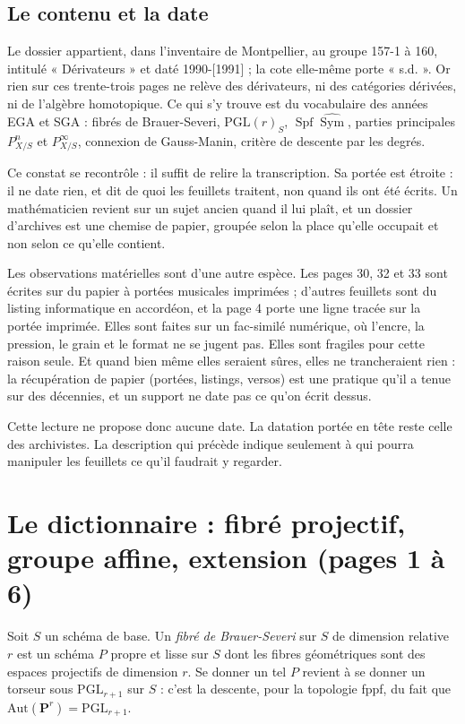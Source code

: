 \documentclass[11pt,a4paper]{article}
\begin{document}
\subsection*{Le contenu et la date}

Le dossier appartient, dans
l'inventaire de Montpellier, au groupe 157-1 à 160, intitulé « Dérivateurs »
et daté 1990-[1991] ; la cote elle-même porte « s.d. ». Or rien sur ces
trente-trois pages ne relève des dérivateurs, ni des catégories dérivées, ni
de l'algèbre homotopique. Ce qui s'y trouve est du vocabulaire des années EGA
et SGA : fibrés de Brauer-Severi, $\mathrm{PGL}(r)_S$,
$\operatorname{Spf} \widehat{\operatorname{Sym}}$, parties principales
$P^n_{X/S}$ et $P^\infty_{X/S}$, connexion de Gauss-Manin, critère de descente
par les degrés.

Ce constat se recontrôle : il suffit de relire la
transcription. Sa portée est étroite : il ne date rien, et dit de quoi les
feuillets traitent, non quand ils ont été écrits. Un mathématicien revient sur un sujet ancien quand il lui plaît, et un
dossier d'archives est une chemise de papier, groupée selon la place qu'elle
occupait et non selon ce qu'elle contient.

Les observations matérielles sont d'une autre espèce. Les pages 30, 32 et 33
sont écrites sur du papier à portées musicales imprimées ; d'autres feuillets
sont du listing informatique en accordéon, et la page 4 porte une ligne tracée
sur la portée imprimée. Elles sont faites sur un
fac-similé numérique, où l'encre, la pression, le grain et le format ne se
jugent pas. Elles sont fragiles pour cette raison seule. Et quand bien même
elles seraient sûres, elles ne trancheraient rien : la récupération de papier
(portées, listings, versos) est une pratique qu'il a tenue sur des
décennies, et un support ne date pas ce qu'on écrit dessus.

Cette lecture ne propose donc aucune date. La datation portée en
tête reste celle des archivistes. La description qui précède indique
seulement à qui pourra manipuler les feuillets ce qu'il faudrait y regarder.

\section*{Le dictionnaire : fibré projectif, groupe affine, extension (pages 1 à 6)}

Soit $S$ un schéma de base. Un \emph{fibré de Brauer-Severi} sur $S$ de
dimension relative $r$ est un schéma $P$ propre et lisse sur $S$ dont les
fibres géométriques sont des espaces projectifs de dimension $r$. Se donner un
tel $P$ revient à se donner un torseur sous $\mathrm{PGL}_{r+1}$ sur $S$ :
c'est la descente, pour la topologie fppf, du fait que
$\mathrm{Aut}(\mathbf{P}^r) = \mathrm{PGL}_{r+1}$.
\end{document}
